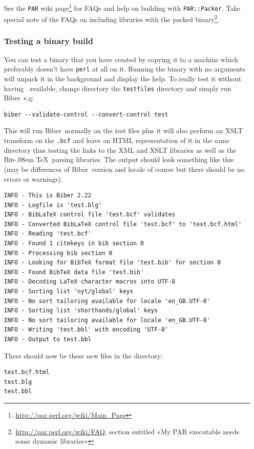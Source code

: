 \documentclass{ltxdockit}
\def\BibTeX{\textsc{Bib}\kern-.08em \TeX}
\newcommand*{\biber}{Biber\xspace}
\begin{document}
See the \verb+PAR+ wiki
page\footnote{\url{http://par.perl.org/wiki/Main_Page}} for FAQs and help
on building with \verb+PAR::Packer+. Take special note of the FAQs on
including libraries with the packed
binary\footnote{\url{http://par.perl.org/wiki/FAQ}, section entitled «My
  PAR executable needs some dynamic libraries»}.

\subsubsection{Testing a binary build}
You can test a binary that you have created by copying it to a machine
which preferably doesn't have \verb+perl+ at all on it. Running the binary with no
arguments will unpack it in the background and display the help. To really
test it without having \latex\ available, change directory the \verb+testfiles+
directory and simply run \biber\ e.g:

\begin{verbatim}
biber --validate-control --convert-control test
\end{verbatim}

\noindent This will run \biber\ normally on the test files plus it
will also perform an XSLT transform on the \verb+.bcf+ and
leave an HTML representation of it in the same directory thus testing the
links to the XML and XSLT libraries as well as the \BibTeX\ parsing
libraries. The output should look something like this (may be differences
of \biber\ version and locale of course but there should be no errors
or warnings).

\begin{verbatim}
INFO - This is Biber 2.22
INFO - Logfile is 'test.blg'
INFO - BibLaTeX control file 'test.bcf' validates
INFO - Converted BibLaTeX control file 'test.bcf' to 'test.bcf.html'
INFO - Reading 'test.bcf'
INFO - Found 1 citekeys in bib section 0
INFO - Processing bib section 0
INFO - Looking for BibTeX format file 'test.bib' for section 0
INFO - Found BibTeX data file 'test.bib'
INFO - Decoding LaTeX character macros into UTF-8
INFO - Sorting list 'nyt/global' keys
INFO - No sort tailoring available for locale 'en_GB.UTF-8'
INFO - Sorting list 'shorthands/global' keys
INFO - No sort tailoring available for locale 'en_GB.UTF-8'
INFO - Writing 'test.bbl' with encoding 'UTF-8'
INFO - Output to test.bbl
\end{verbatim}

\noindent There should now be these new files in the directory:

\begin{verbatim}
test.bcf.html
test.blg
test.bbl
\end{verbatim}
\end{document}
